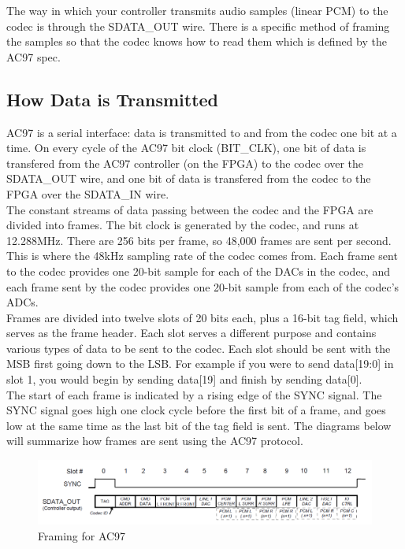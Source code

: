 \documentclass[11pt]{article}
\begin{document}
The way in which your controller transmits audio samples (linear PCM) to the codec is through the SDATA\_OUT wire. There is a specific method of framing the samples so that the codec knows how to read them which is defined by the AC97 spec. \\

\subsection{How Data is Transmitted}
AC97 is a serial interface: data is transmitted to and from the codec one bit at a time. On every cycle of the AC97 bit clock (BIT\_CLK), one bit of data is transfered from the AC97 controller (on the FPGA) to the codec over the SDATA\_OUT wire, and one bit of data is transfered from the codec to the FPGA over the SDATA\_IN wire. \\

The constant streams of data passing between the codec and the FPGA are divided into frames. The bit clock is generated by the codec, and runs at 12.288MHz. There are 256 bits per frame, so 48,000 frames are sent per second. This is where the 48kHz sampling rate of the codec comes from. Each frame sent to the codec provides one 20-bit sample for each of the DACs in the codec, and each frame sent by the codec provides one 20-bit sample from each of the codec's ADCs. \\

Frames are divided into twelve slots of 20 bits each, plus a 16-bit tag field, which serves as the frame header. Each slot serves a different purpose and contains various types of data to be sent to the codec. Each slot should be sent with the MSB first going down to the LSB. For example if you were to send data[19:0] in slot 1, you would begin by sending data[19] and finish by sending data[0]. \\

The start of each frame is indicated by a rising edge of the SYNC signal. The SYNC signal goes high one clock cycle before the first bit of a frame, and goes low at the same time as the last bit of the tag field is sent. The diagrams below will summarize how frames are sent using the AC97 protocol. \\

\begin{figure}[hbt]
	\begin{center}
		\includegraphics[width=6in]{ac97_framing}
		\caption{Framing for AC97}
	\end{center}
\end{figure}
\end{document}
